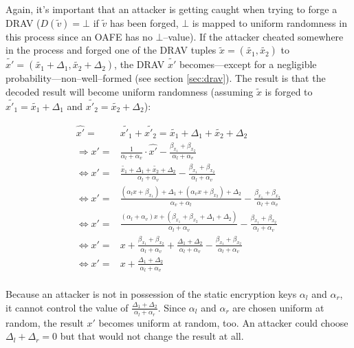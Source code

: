 Again, it's important that an attacker is getting caught when trying to forge a
DRAV ($D(\widetilde{v}) = \bot$ if $\widetilde{v}$ has been forged, $\bot$ is
mapped to uniform randomness in this process since an OAFE has no
$\bot$--value). If the attacker cheated somewhere in the process and forged one
of the DRAV tuples $\widetilde{x} = (\widetilde{x_1}, \widetilde{x_2})$ to
$\widetilde{x'} = (\widetilde{x_1} + \Delta_1, \widetilde{x_2} + \Delta_2)$, the
DRAV $\widetilde{x'}$ becomes---except for a negligible
probability---non--well--formed (see section \ref{sec:drav}). The result is that
the decoded result will become uniform randomness (assuming $\widetilde{x}$ is
forged to $\widetilde{x'_1} = \widetilde{x_1} + \Delta_1$ and $\widetilde{x'_2}
= \widetilde{x_2} + \Delta_2$):

\begin{align*}
  \widehat{x'} = & \widetilde{x'_1} + \widetilde{x'_2} = \widetilde{x_1} +
  \Delta_1 + \widetilde{x_2} + \Delta_2 \\
  \Rightarrow x' = & \frac{1}{\alpha_l + \alpha_v} \cdot \widehat{x'} -
  \frac{\beta_{x_1} +
  \beta_{x_2}}{\alpha_l + \alpha_v} \\
  \Leftrightarrow x' = & \frac{\widetilde{x_1} + \Delta_1 +
  \widetilde{x_2} + \Delta_2}{\alpha_l + \alpha_v} -
  \frac{\beta_{x_1} +\beta_{x_2}}{\alpha_l + \alpha_v}\\
  \Leftrightarrow x' = & \frac{(\alpha_l x + \beta_{x_1}) + \Delta_1 +
  (\alpha_v x + \beta_{x_2}) + \Delta_2}{\alpha_v + \alpha_l} -
  \frac{\beta_{x_1} +\beta_{x_2}}{\alpha_l + \alpha_v} \\
  \Leftrightarrow x' = & \frac{(\alpha_l+\alpha_v)x + (\beta_{x_1}+\beta_{x_2} +
  \Delta_1+\Delta_2)}{\alpha_l+\alpha_v} -
  \frac{\beta_{x_1} +\beta_{x_2}}{\alpha_l + \alpha_v} \\
  \Leftrightarrow x' = & x + \frac{\beta_{x_1}+\beta_{x_2}}{\alpha_l+\alpha_v}
  + \frac{\Delta_1 + \Delta_2}{\alpha_l + \alpha_v} -
  \frac{\beta_{x_1}+\beta_{x_2}}{\alpha_l + \alpha_v} \\
  \Leftrightarrow x' = & x + \frac{\Delta_1 + \Delta_2}{\alpha_l + \alpha_v}\\
\end{align*}

Because an attacker is not in possession of the static encryption keys
$\alpha_l$ and $\alpha_r$, it cannot control the value of $\frac{\Delta_1 +
\Delta_2}{\alpha_l + \alpha_r}$. Since $\alpha_l$ and $\alpha_r$ are chosen
uniform at random, the result $x'$ becomes uniform at random, too. An attacker
could choose $\Delta_l + \Delta_r = 0$ but that would not change the result at
all.


